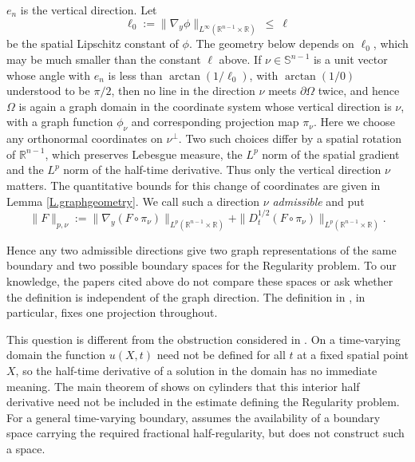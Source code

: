 \documentclass[10pt,a4paper]{amsart}
\numberwithin{equation}{section}
\newcommand{\R}{\mathbb R}
\newcommand{\om}{\Omega}
\newcommand{\pom}{\partial\Omega}
\newcommand{\dhalf}{D_t^{1/2}}
\begin{document}
$e_n$ is the vertical direction. Let
\begin{equation}\label{E.ell0}
  \ell_0:=\big\|\nabla_y\phi\big\|_{L^\infty(\R^{n-1}\times\R)}\ \le\ \ell
\end{equation}
be the spatial Lipschitz constant of $\phi$. The geometry below depends on
$\ell_0$, which may be much smaller than the constant $\ell$ above. If
$\nu\in\mathbb S^{n-1}$ is a unit vector whose angle with $e_n$ is less than
$\arctan(1/\ell_0)$, with $\arctan(1/0)$ understood to be $\pi/2$,
then no line in the direction $\nu$ meets $\pom$ twice, and hence
$\om$ is again a graph domain in the coordinate system whose vertical direction
is $\nu$, with a graph function $\phi_\nu$ and corresponding projection map
$\pi_\nu$. Here we choose any orthonormal coordinates on $\nu^\perp$. Two
such choices differ by a spatial rotation of $\R^{n-1}$, which preserves
Lebesgue measure, the $L^p$ norm of the spatial gradient and the $L^p$ norm of
the half-time derivative. Thus only the vertical direction $\nu$ matters.
The quantitative bounds for this change of coordinates are given in
Lemma \ref{L.graphgeometry}. We call such a direction $\nu$ \emph{admissible} and put
\begin{equation}\label{E.datumnu}
 \|F\|_{p,\nu}:=
 \|\nabla_y(F\circ\pi_\nu)\|_{L^p(\R^{n-1}\times\R)}
 +\|\dhalf(F\circ\pi_\nu)\|_{L^p(\R^{n-1}\times\R)}.
\end{equation}

\noindent Hence any two admissible directions give two graph representations
of the same boundary and two possible boundary spaces for the Regularity
problem. To our knowledge, the papers cited above do not compare these spaces
or ask whether the definition is independent of the graph direction. The
definition in
\cite[(20)--(22)]{Nys06}, in particular, fixes one projection throughout.\medskip

\noindent This question is different from the obstruction considered in
\cite[\S1]{Din}. On a time-varying domain the function $u(X,t)$ need not be
defined for all $t$ at a fixed spatial point $X$, so the half-time derivative
of a solution in the domain has no immediate meaning. The main theorem of
\cite{Din} shows on cylinders that this interior half derivative need not be
included in the estimate defining the Regularity problem. For a general
time-varying boundary, \cite[Definition 1.2]{Din} assumes the availability of
a boundary space carrying the required fractional half-regularity, but does
not construct such a space.\medskip
\end{document}
